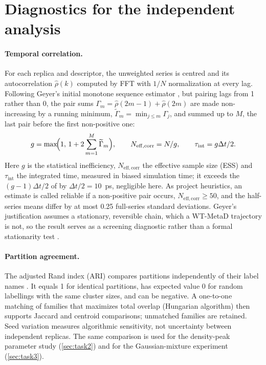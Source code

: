 \section{Diagnostics for the independent analysis}
\label{sec:diagnostics}
\paragraph{Temporal correlation.}
For each replica and descriptor, the unweighted series is centred and its autocorrelation $\widehat\rho(k)$ computed by FFT with $1/N$ normalization at every lag. Following Geyer's initial monotone sequence estimator \autocite{geyer1992}, but pairing lags from 1 rather than 0, the pair sums $\Gamma_m=\widehat\rho(2m-1)+\widehat\rho(2m)$ are made non-increasing by a running minimum, $\widetilde\Gamma_m=\min_{j\le m}\Gamma_j$, and summed up to $M$, the last pair before the first non-positive one:
\begin{equation}
g=\max\!\Bigl(1,\,1+2\sum_{m=1}^{M}\widetilde\Gamma_m\Bigr),\qquad
N_{\mathrm{eff,corr}}=N/g,\qquad \tau_{\mathrm{int}}=g\Delta t/2.
\label{eq:correlation}
\end{equation}
Here $g$ is the statistical inefficiency, $N_{\mathrm{eff,corr}}$ the effective sample size (ESS) and $\tau_{\mathrm{int}}$ the integrated time, measured in biased simulation time; it exceeds the $(g-1)\Delta t/2$ of \textcite{chodera2016} by $\Delta t/2=10$~ps, negligible here. As project heuristics, an estimate is called reliable if a non-positive pair occurs, $N_{\mathrm{eff,corr}}\geq50$, and the half-series means differ by at most 0.25 full-series standard deviations. Geyer's justification assumes a stationary, reversible chain, which a WT-MetaD trajectory is not, so the result serves as a screening diagnostic rather than a formal stationarity test \autocite{grossfield2019}.

\paragraph{Partition agreement.} The adjusted Rand index (ARI) compares partitions independently of their label names \autocite{hubert1985}. It equals 1 for identical partitions, has expected value 0 for random labellings with the same cluster sizes, and can be negative. A one-to-one matching of families that maximizes total overlap (Hungarian algorithm) then supports Jaccard and centroid comparisons; unmatched families are retained. Seed variation measures algorithmic sensitivity, not uncertainty between independent replicas. The same comparison is used for the density-peak parameter study (\cref{sec:task2}) and for the Gaussian-mixture experiment (\cref{sec:task3}).

